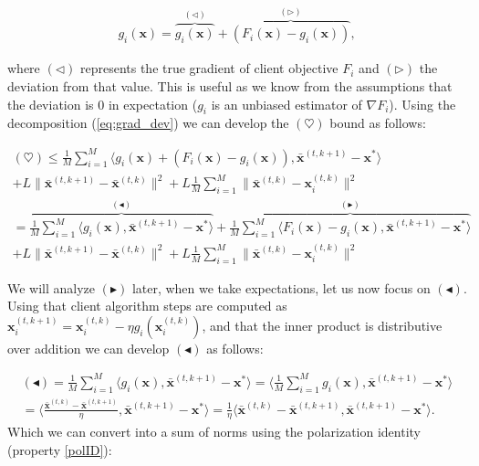 \begin{align}
    g_i(\bm{x}) = \overbrace{g_i(\bm{x})}^{(\triangleleft)} + \overbrace{\left(F_i(\bm{x}) - g_i(\bm{x}) \right)}^{(\triangleright)},
    \label{eq:grad_dev}
\end{align}

where $(\triangleleft)$ represents the true gradient of client objective $F_i$ and $(\triangleright)$ the deviation from that value. This is useful as we know from the assumptions that the deviation is $0$ in expectation ($g_i$ is an unbiased estimator of $\nabla F_i$). Using the decomposition (\ref{eq:grad_dev}) we can develop the $(\heartsuit)$ bound as follows:

\begin{align*}
    (\heartsuit) \leq \frac{1}{M} \sum_{i=1}^M  \langle g_i(\bm{x})  + \left(F_i(\bm{x}) - g_i(\bm{x}) \right) ,\bar{\bm{x}}^{(t,k+1)} - \bm{x}^{*} \rangle  \\+ L  \|\bar{\bm{x}}^{(t,k+1)}-\bar{\bm{x}}^{(t,k)} \|^2  +L \frac{1}{M} \sum_{i=1}^M \|\bar{\bm{x}}^{(t,k)}-\bm{x}_i^{(t,k)} \|^2 \\
    = \overbrace{\frac{1}{M} \sum_{i=1}^M  \langle g_i(\bm{x})  ,\bar{\bm{x}}^{(t,k+1)} - \bm{x}^{*} \rangle  }^{(\blacktriangleleft)}
    + \overbrace{\frac{1}{M} \sum_{i=1}^M  \langle F_i(\bm{x}) - g_i(\bm{x})  ,\bar{\bm{x}}^{(t,k+1)} - \bm{x}^{*} \rangle  }^{(\blacktriangleright)}
    \\+ L  \|\bar{\bm{x}}^{(t,k+1)}-\bar{\bm{x}}^{(t,k)} \|^2  +L \frac{1}{M} \sum_{i=1}^M \|\bar{\bm{x}}^{(t,k)}-\bm{x}_i^{(t,k)} \|^2 
\end{align*}

We will analyze $(\blacktriangleright)$ later, when we take expectations, let us now focus on $(\blacktriangleleft)$. Using that client algorithm steps are computed as $\bm{x}_i^{(t,k+1)} = \bm{x}_i^{(t,k)} - \eta g_i(\bm{x}_i^{(t,k)})$, and that the inner product is distributive over addition we can develop $(\blacktriangleleft)$ as follows:

\begin{align*}
    (\blacktriangleleft) = \frac{1}{M} \sum_{i=1}^M  \langle g_i(\bm{x})  ,\bar{\bm{x}}^{(t,k+1)} - \bm{x}^{*} \rangle =  \langle \frac{1}{M} \sum_{i=1}^M  g_i(\bm{x})  ,\bar{\bm{x}}^{(t,k+1)} - \bm{x}^{*} \rangle \\
    =  \Bigg\langle \frac{\bar{\bm{x}}^{(t,k)} - \bar{\bm{x}}^{(t,k+1)}}{\eta},\bar{\bm{x}}^{(t,k+1)} - \bm{x}^{*} \Bigg\rangle = \frac{1}{\eta} \langle \bar{\bm{x}}^{(t,k)} - \bar{\bm{x}}^{(t,k+1)}  ,\bar{\bm{x}}^{(t,k+1)} - \bm{x}^{*} \rangle.
\end{align*}
\noindent
Which we can convert into a sum of norms using the polarization identity (property \ref{polID}):

